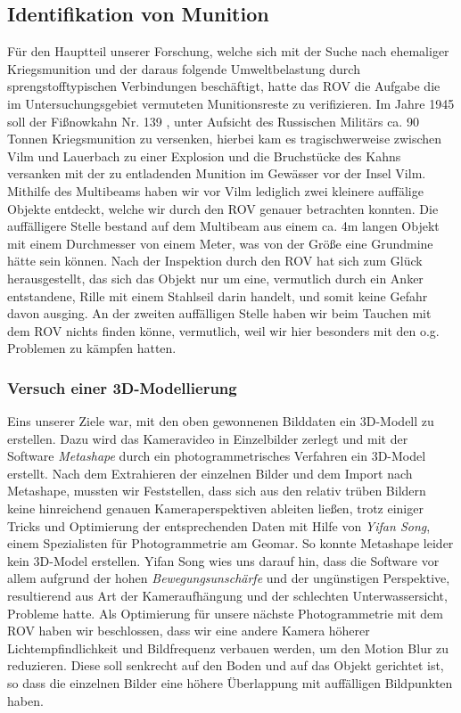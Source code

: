 \subsection{Identifikation von Munition}
Für den Hauptteil unserer Forschung, welche sich mit der Suche nach ehemaliger Kriegsmunition und der daraus folgende Umweltbelastung durch sprengstofftypischen Verbindungen beschäftigt,
hatte das ROV die Aufgabe die im Untersuchungsgebiet vermuteten Munitionsreste zu verifizieren. 
Im Jahre 1945 soll der Fißnowkahn Nr. 139 , unter Aufsicht des Russischen Militärs ca. 90 Tonnen Kriegsmunition zu versenken, hierbei kam es tragischwerweise zwischen Vilm und Lauerbach zu einer Explosion und die Bruchstücke des Kahns versanken mit der zu entladenden Munition im Gewässer vor der Insel Vilm.
Mithilfe des Multibeams haben wir vor Vilm lediglich zwei kleinere auffälige Objekte entdeckt, welche wir durch den ROV genauer betrachten konnten. Die auffälligere Stelle bestand auf dem Multibeam aus einem ca. 4m langen Objekt mit einem Durchmesser von einem Meter, was von der Größe eine Grundmine hätte sein können.
Nach der Inspektion durch den ROV hat sich zum Glück herausgestellt, das sich das Objekt nur um eine, vermutlich durch ein Anker entstandene, Rille mit einem Stahlseil darin handelt, und somit keine Gefahr davon ausging.
An der zweiten auffälligen Stelle haben wir beim Tauchen mit dem ROV nichts finden könne, vermutlich, weil wir hier besonders mit den o.g. Problemen zu kämpfen hatten. 

\subsubsection{Versuch einer 3D-Modellierung}
Eins unserer Ziele war, mit den oben gewonnenen Bilddaten ein 3D-Modell zu erstellen. Dazu wird das Kameravideo in Einzelbilder zerlegt und mit der Software \emph{Metashape} durch ein photogrammetrisches Verfahren ein 3D-Model erstellt. 
Nach dem Extrahieren der einzelnen Bilder und dem Import nach Metashape, mussten wir Feststellen, dass sich aus den relativ trüben Bildern keine hinreichend genauen Kameraperspektiven ableiten ließen, trotz einiger Tricks und Optimierung der entsprechenden Daten mit Hilfe von \emph{Yifan Song}, einem Spezialisten für Photogrammetrie am Geomar. So konnte Metashape leider kein 3D-Model erstellen.
Yifan Song wies uns darauf hin, dass die Software vor allem aufgrund der hohen \emph{Bewegungsunschärfe} und der ungünstigen Perspektive, resultierend aus Art der Kameraufhängung und der schlechten Unterwassersicht, Probleme hatte. 
Als Optimierung für unsere nächste Photogrammetrie mit dem ROV haben wir beschlossen, dass wir eine andere Kamera höherer Lichtempfindlichkeit und Bildfrequenz verbauen werden, um den Motion Blur zu reduzieren. Diese soll senkrecht auf den Boden und auf das Objekt gerichtet ist, so dass die einzelnen Bilder eine höhere Überlappung mit auffälligen Bildpunkten haben.
\\

